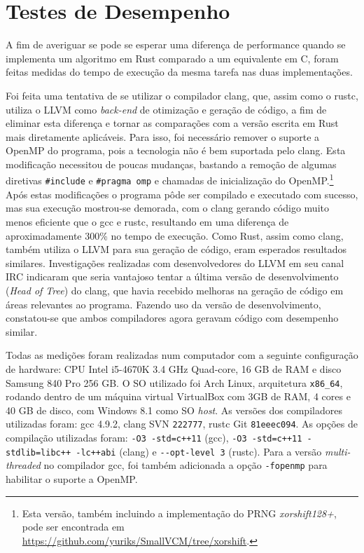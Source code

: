 \documentclass[tg]{mdtufsm}
\def\Cpp{{C\nolinebreak[4]\raisebox{.20ex}{\small\bf++}}}
\begin{document}
\section{Testes de Desempenho}

A fim de averiguar se pode se esperar uma diferença de performance quando se implementa um algoritmo em Rust comparado a um equivalente em \Cpp, foram feitas medidas do tempo de execução da mesma tarefa nas duas implementações.

Foi feita uma tentativa de se utilizar o compilador clang, que, assim como o rustc, utiliza o LLVM como \emph{back-end} de otimização e geração de código, a fim de eliminar esta diferença e tornar as comparações com a versão escrita em Rust mais diretamente aplicáveis. Para isso, foi necessário remover o suporte a OpenMP do programa, pois a tecnologia não é bem suportada pelo clang. Esta modificação necessitou de poucas mudanças, bastando a remoção de algumas diretivas \texttt{\#include} e \texttt{\#pragma omp} e chamadas de inicialização do OpenMP.\footnote{Esta versão, também incluindo a implementação do PRNG \emph{xorshift128+}, pode ser encontrada em \url{https://github.com/yuriks/SmallVCM/tree/xorshift}.} Após estas modificações o programa pôde ser compilado e executado com sucesso, mas sua execução mostrou-se demorada, com o clang gerando código muito menos eficiente que o gcc e rustc, resultando em uma diferença de aproximadamente 300\% no tempo de execução. Como Rust, assim como clang, também utiliza o LLVM para sua geração de código, eram esperados resultados similares. Investigações realizadas com desenvolvedores do LLVM em seu canal IRC indicaram que seria vantajoso tentar a última versão de desenvolvimento (\emph{Head of Tree}) do clang, que havia recebido melhoras na geração de código em áreas relevantes ao programa. Fazendo uso da versão de desenvolvimento, constatou-se que ambos compiladores agora geravam código com desempenho similar.

Todas as medições foram realizadas num computador com a seguinte configuração de hardware: CPU Intel i5-4670K 3.4 GHz Quad-core, 16 GB de RAM e disco Samsung 840 Pro 256 GB. O SO utilizado foi Arch Linux, arquitetura \texttt{x86\_64}, rodando dentro de um máquina virtual VirtualBox com 3GB de RAM, 4 cores e 40 GB de disco, com Windows 8.1 como SO \emph{host}. As versões dos compiladores utilizadas foram: gcc 4.9.2, clang SVN \texttt{222777}, rustc Git \texttt{81eeec094}. As opções de compilação utilizadas foram: \texttt{-O3 -std=c++11} (gcc), \texttt{-O3 -std=c++11 -stdlib=libc++ -lc++abi} (clang) e \texttt{-{}-opt-level 3} (rustc). Para a versão \emph{multi-threaded} no compilador gcc, foi também adicionada a opção \texttt{-fopenmp} para habilitar o suporte a OpenMP.
\end{document}

